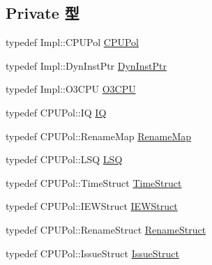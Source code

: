 \subsection*{Private 型}
\begin{DoxyCompactItemize}
\item 
typedef Impl::CPUPol \hyperlink{classDefaultIEW_a87d662eaeb9eab249d671b63cb4ba11a}{CPUPol}
\item 
typedef Impl::DynInstPtr \hyperlink{classDefaultIEW_a028ce10889c5f6450239d9e9a7347976}{DynInstPtr}
\item 
typedef Impl::O3CPU \hyperlink{classDefaultIEW_a44622cf06940413482836cb62931ac3f}{O3CPU}
\item 
typedef CPUPol::IQ \hyperlink{classDefaultIEW_aaecfbaa9bf5c22b455806f40f49ef627}{IQ}
\item 
typedef CPUPol::RenameMap \hyperlink{classDefaultIEW_a341963bcea1928476182a17e357f98e3}{RenameMap}
\item 
typedef CPUPol::LSQ \hyperlink{classDefaultIEW_a5a50654edfc0d8f12a301d17cf859e4c}{LSQ}
\item 
typedef CPUPol::TimeStruct \hyperlink{classDefaultIEW_ab7dd3632ef639702a5c6e7c2c3a2f82a}{TimeStruct}
\item 
typedef CPUPol::IEWStruct \hyperlink{classDefaultIEW_a7cf3f052f760b3a8a18623f792c10910}{IEWStruct}
\item 
typedef CPUPol::RenameStruct \hyperlink{classDefaultIEW_a0c2a89ad2edad9ad605d0461f9b132a5}{RenameStruct}
\item 
typedef CPUPol::IssueStruct \hyperlink{classDefaultIEW_aea279208ef417c3e47681ba0d183bd04}{IssueStruct}
\end{DoxyCompactItemize}
